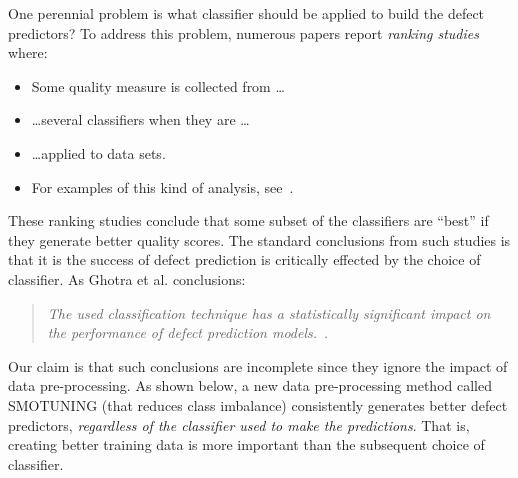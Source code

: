 \documentclass[10pt,conference]{IEEEtran}
\newcommand{\bi}{\begin{itemize}[leftmargin=0.4cm]}
\newcommand{\ei}{\end{itemize}}
\theoremstyle{break}
\theoremstyle{break}
\begin{document}
One perennial problem   is what classifier should be applied to build the defect predictors?
To address this problem, numerous papers report {\em ranking studies} where:
\bi
\item
Some quality measure  is collected from \ldots
\item
\ldots several  classifiers when they are \dots
\item
\ldots applied to data sets.
\item
For examples of this kind of analysis, see~\cite{lessmann2008benchmarking,hall2012systematic,elish2008predicting,menzies2010defect,gondra2008applying,radjenovic2013software,jiang2008techniques,wang2013using,mende2009revisiting,li2012sample,khoshgoftaar2010attribute,jiang2009variance,ghotra2015revisiting,jiang2008can,tantithamthavorn2016automated,fu2016tuning}.
\ei
These ranking studies conclude that some subset of the classifiers
are  ``best'' if they generate  better quality scores.
The standard conclusions from such studies is that it
is the success of defect prediction is critically
effected by the choice of classifier. As Ghotra et al. conclusions:

\begin{quote}{\em The  used classification
technique has a statistically significant impact
on the performance of defect prediction models.}~\cite{ghotra2015revisiting}.
\end{quote}

Our claim is that such conclusions are incomplete since
they ignore the impact of  
data pre-processing. As shown below,
a new data pre-processing method called SMOTUNING
(that reduces
class imbalance) consistently generates better 
defect predictors,
{\em regardless of the classifier used
to make the predictions}.  That is,  creating better training data is more important
than the subsequent choice of classifier. 
 
\end{document}
